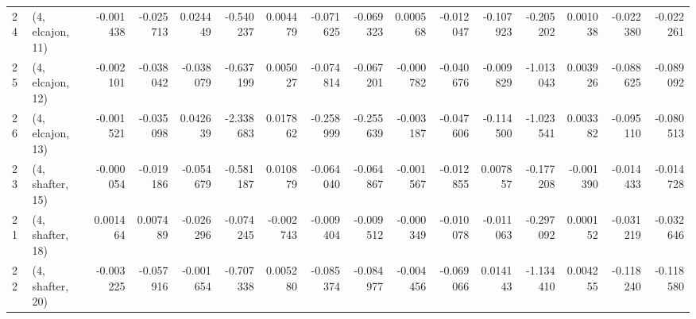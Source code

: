 \begin{tabular}{llrrrrrrrrrrrrrr}
24 &  (4, elcajon, 11) &  -0.001438 & -0.025713 &  0.024449 &  -0.540237 &  0.004479 &  -0.071625 & -0.069323 &  0.000568 & -0.012047 & -0.107923 &  -0.205202 &  0.001038 & -0.022380 & -0.022261 \\
25 &  (4, elcajon, 12) &  -0.002101 & -0.038042 & -0.038079 &  -0.637199 &  0.005027 &  -0.074814 & -0.067201 & -0.000782 & -0.040676 & -0.009829 &  -1.013043 &  0.003926 & -0.088625 & -0.089092 \\
26 &  (4, elcajon, 13) &  -0.001521 & -0.035098 &  0.042639 &  -2.338683 &  0.017862 &  -0.258999 & -0.255639 & -0.003187 & -0.047606 & -0.114500 &  -1.023541 &  0.003382 & -0.095110 & -0.080513 \\
23 &  (4, shafter, 15) &  -0.000054 & -0.019186 & -0.054679 &  -0.581187 &  0.010879 &  -0.064040 & -0.064867 & -0.001567 & -0.012855 &  0.007857 &  -0.177208 & -0.001390 & -0.014433 & -0.014728 \\
21 &  (4, shafter, 18) &   0.001464 &  0.007489 & -0.026296 &  -0.074245 & -0.002743 &  -0.009404 & -0.009512 & -0.000349 & -0.010078 & -0.011063 &  -0.297092 &  0.000152 & -0.031219 & -0.032646 \\
22 &  (4, shafter, 20) &  -0.003225 & -0.057916 & -0.001654 &  -0.707338 &  0.005280 &  -0.085374 & -0.084977 & -0.004456 & -0.069066 &  0.014143 &  -1.134410 &  0.004255 & -0.118240 & -0.118580 \\
\bottomrule
\end{tabular}

